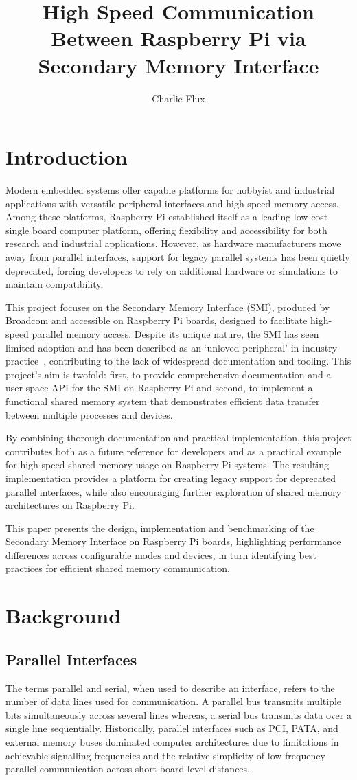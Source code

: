 \documentclass[final]{cmpreport}
\title{High Speed Communication Between Raspberry Pi via Secondary Memory Interface}
\author{Charlie Flux}
\begin{document}
\section{Introduction}
Modern embedded systems offer capable platforms for hobbyist and industrial applications with versatile peripheral interfaces and high-speed memory access. Among these platforms, Raspberry Pi established itself as a leading low-cost single board computer platform, offering flexibility and accessibility for both research and industrial applications. However, as hardware manufacturers move away from parallel interfaces, support for legacy parallel systems has been quietly deprecated, forcing developers to rely on additional hardware or simulations to maintain compatibility. 

This project focuses on the Secondary Memory Interface (SMI), produced by Broadcom and accessible on Raspberry Pi boards, designed to facilitate high-speed parallel memory access. Despite its unique nature, the SMI has seen limited adoption and has been described as an `unloved peripheral' in industry practice~\cite{zotero-item-18}, contributing to the lack of widespread documentation and tooling. This project's aim is twofold: first, to provide comprehensive documentation and a user-space API for the SMI on Raspberry Pi and second, to implement a functional shared memory system that demonstrates efficient data transfer between multiple processes and devices.

By combining thorough documentation and practical implementation, this project contributes both as a future reference for developers and as a practical example for high-speed shared memory usage on Raspberry Pi systems. The resulting implementation provides a platform for creating legacy support for deprecated parallel interfaces, while also encouraging further exploration of shared memory architectures on Raspberry Pi.

This paper presents the design, implementation and benchmarking of the Secondary Memory Interface on Raspberry Pi boards, highlighting performance differences across configurable modes and devices, in turn identifying best practices for efficient shared memory communication.

\section{Background}

\subsection{Parallel Interfaces}
The terms parallel and serial, when used to describe an interface, refers to the number of data lines used for communication. A parallel bus transmits multiple bits simultaneously across several lines whereas, a serial bus transmits data over a single line sequentially. Historically, parallel interfaces such as PCI, PATA, and external memory buses dominated computer architectures due to limitations in achievable signalling frequencies and the relative simplicity of low-frequency parallel communication across short board-level distances.
\end{document}
